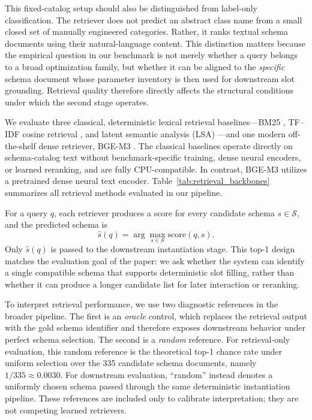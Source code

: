 \documentclass[pdflatex,sn-basic,Numbered]{sn-jnl}
\begin{document}
This fixed-catalog setup should also be distinguished from label-only classification. The retriever does not predict an abstract class name from a small closed set of manually engineered categories. Rather, it ranks textual schema documents using their natural-language content. This distinction matters because the empirical question in our benchmark is not merely whether a query belongs to a broad optimization family, but whether it can be aligned to the \emph{specific} schema document whose parameter inventory is then used for downstream slot grounding. Retrieval quality therefore directly affects the structural conditions under which the second stage operates.

We evaluate three classical, deterministic lexical retrieval baselines---BM25 \cite{robertson2009bm25}, TF--IDF cosine retrieval \cite{pedregosa2011sklearn}, and latent semantic analysis (LSA) \cite{deerwester1990lsa}---and one modern off-the-shelf dense retriever, BGE-M3 \cite{chen2024m3embedding}. The classical baselines operate directly on schema-catalog text without benchmark-specific training, dense neural encoders, or learned reranking, and are fully CPU-compatible. In contrast, BGE-M3 utilizes a pretrained dense neural text encoder. Table~\ref{tab:retrieval_backbones} summarizes all retrieval methods evaluated in our pipeline.

For a query $q$, each retriever produces a score for every candidate schema $s \in \mathcal{S}$, and the predicted schema is
\begin{equation}
\hat{s}(q) = \arg\max_{s \in \mathcal{S}} \mathrm{score}(q,s).
\label{eq:schema_retrieval}
\end{equation}
Only $\hat{s}(q)$ is passed to the downstream instantiation stage. This top-1 design matches the evaluation goal of the paper: we ask whether the system can identify a single compatible schema that supports deterministic slot filling, rather than whether it can produce a longer candidate list for later interaction or reranking.

To interpret retrieval performance, we use two diagnostic references in the broader pipeline. The first is an \emph{oracle} control, which replaces the retrieval output with the gold schema identifier and therefore exposes downstream behavior under perfect schema selection. The second is a \emph{random} reference. For retrieval-only evaluation, this random reference is the theoretical top-1 chance rate under uniform selection over the 335 candidate schema documents, namely $1/335 \approx 0.0030$. For downstream evaluation, ``random'' instead denotes a uniformly chosen schema passed through the same deterministic instantiation pipeline. These references are included only to calibrate interpretation; they are not competing learned retrievers.
\end{document}
